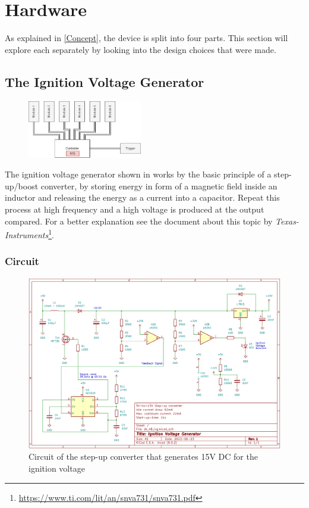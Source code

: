 \pagebreak

\section{Hardware}
\label{Hardware}

As explained in \cref{Concept}, the device is split into four parts. This section will explore each separately by looking into the design choices that were made. 


\subsection{The Ignition Voltage Generator}
\label{Ignition Voltage Generator}

\begin{figure}[!ht]
    \centering
    \includegraphics[width=5cm]{./Figures/concept_ivg.png} 
\end{figure}

\noindent The ignition voltage generator shown in  works by the basic principle of a step-up/boost converter, by storing energy in form of a magnetic field inside an inductor and releasing the energy as a current into a capacitor. Repeat this process at high frequency and a high voltage is produced at the output compared. For a better explanation see the document about this topic by \textit{Texas-Instruments}\footnote{\url{https://www.ti.com/lit/an/snva731/snva731.pdf}}.


\subsubsection{Circuit}

\begin{figure}[!ht]
    \centering
    \includegraphics[width=15cm]{./Figures/ivg_circuit.png}
    \caption{Circuit of the step-up converter that generates 15V DC for the ignition voltage}
    \label{fig:ivg_circuit}     
\end{figure}

